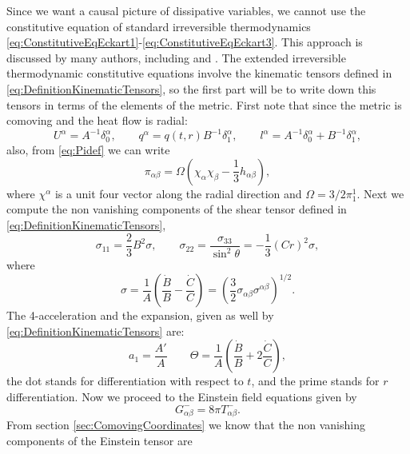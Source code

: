 Since we want a causal picture of dissipative variables, we cannot use the constitutive equation of standard irreversible thermodynamics \ref{eq:ConstitutiveEqEckart1}-\ref{eq:ConstitutiveEqEckart3}. This approach is discussed by many authors, including \cite{herrera2004dynamics} and \cite{pinheiro2008radiating}. The extended irreversible thermodynamic constitutive equations involve the kinematic tensors defined in \ref{eq:DefinitionKinematicTensors}, so the first part will be to write down this tensors in terms of the elements of the metric. First note that since the metric is comoving and the heat flow is radial:
\begin{equation}
	U^{\alpha} = A^{-1}\delta^{\alpha}_{0},\qquad q^{\alpha} = q(t,r) B^{-1}\delta^{\alpha}_1 ,\qquad l^{\alpha} = A^{-1}\delta^{\alpha}_{0} + B^{-1}\delta^{\alpha}_1, 
\end{equation}
also, from \ref{eq:Pidef} we can write
\begin{equation}
	\label{eq:Pidef2}
	\pi_{\alpha\beta} = \Omega(\chi_{\alpha}\chi_{\beta} - \frac{1}{3}h_{\alpha\beta}) ,
\end{equation}
where $\chi^{\alpha}$ is a unit four vector along the radial direction and $\Omega = 3/2\pi^{1}_{1}$. Next we compute the non vanishing components of the shear tensor defined in \ref{eq:DefinitionKinematicTensors},
\begin{equation}
	\sigma_{11} = \frac{2}{3}B^2 \sigma ,\qquad \sigma_{22} = \frac{\sigma_{33}}{\sin ^2 \theta} = -\frac{1}{3} (Cr)^2 \sigma ,
\end{equation}
where
\begin{equation}
	\sigma = \frac{1}{A}\left(\frac{\dot{B}}{B} - \frac{\dot{C}}{C}\right) = \left( \frac{3}{2} \sigma_{\alpha\beta}\sigma^{\alpha\beta} \right)^{1/2}.
\end{equation}
The 4-acceleration and the expansion, given as well by \ref{eq:DefinitionKinematicTensors} are:
\begin{equation}
	a_1 = \frac{A'}{A} \qquad \Theta = \frac{1}{A} \left( \frac{\dot{B}}{B} + 2 \frac{\dot{C}}{C} \right),
\end{equation}
the dot stands for differentiation with respect to $t$, and the prime stands for $r$ differentiation. Now we proceed to the Einstein field equations given by
\begin{equation}
	G_{\alpha\beta}^{-} = 8\pi T^{-}_{\alpha\beta} .
\end{equation}
From section \ref{sec:ComovingCoordinates} we know that the non vanishing components of the Einstein tensor are
